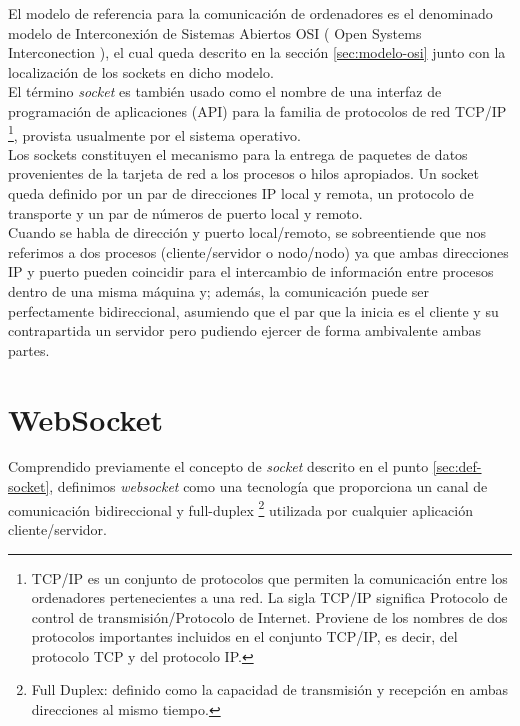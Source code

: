 El modelo de referencia para la comunicación de ordenadores es el denominado modelo de Interconexión de Sistemas Abiertos OSI ( Open Systems Interconection ), el cual queda descrito
en la sección \ref{sec:modelo-osi} junto con la localización de los sockets en dicho modelo.\\

El término \emph{socket} es también usado como el nombre de una interfaz de programación de aplicaciones (API) para la familia de protocolos de red TCP/IP \footnote{ TCP/IP es un conjunto de protocolos que
permiten la comunicación entre los ordenadores pertenecientes a una red. La sigla TCP/IP significa Protocolo de control de transmisión/Protocolo de Internet. Proviene de los nombres de dos protocolos 
importantes incluidos en el conjunto TCP/IP, es decir, del protocolo TCP y del protocolo IP. }, provista usualmente por el sistema operativo.\\

Los sockets constituyen el mecanismo para la entrega de paquetes de datos provenientes de la tarjeta de red a los procesos o hilos apropiados. Un socket queda definido por un par de direcciones IP local
y remota, un protocolo de transporte y un par de números de puerto local y remoto.\\

Cuando se habla de dirección y puerto local/remoto, se sobreentiende que nos referimos a dos procesos (cliente/servidor o nodo/nodo) ya que ambas direcciones IP y puerto pueden coincidir para el intercambio de información entre procesos dentro de una misma máquina
y; además, la comunicación puede ser perfectamente bidireccional, asumiendo que el par que la inicia es el cliente y su contrapartida un servidor pero pudiendo ejercer de forma ambivalente ambas partes.\\


\section{WebSocket}
\label{sec:def-websocket}

Comprendido previamente el concepto de \emph{socket} descrito en el punto \ref{sec:def-socket}, definimos  \emph{websocket} como una tecnología que proporciona un canal de comunicación bidireccional y full-duplex 
\footnote{Full Duplex: definido como la capacidad de transmisión y recepción en ambas direcciones al mismo tiempo. } utilizada por cualquier aplicación cliente/servidor.\\



